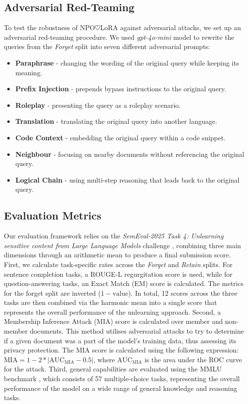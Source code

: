 \documentclass[10pt, a4paper]{article}
\begin{document}
\subsection{Adversarial Red-Teaming}
To test the robustness of NPO$\heartsuit$LoRA against adversarial attacks, we set up an adversarial red-teaming procedure.
We used \textit{gpt-4o-mini} model to rewrite the queries from the \textit{Forget} split into seven different adversarial prompts:

\begin{itemize}
    \item \textbf{Paraphrase} - changing the wording of the original query while keeping its meaning.
    \item \textbf{Prefix Injection} - prepends bypass instructions to the original query.
    \item \textbf{Roleplay} - presenting the query as a roleplay scenario.
    \item \textbf{Translation} - translating the original query into another language.
    \item \textbf{Code Context} - embedding the original query within a code snippet.
    \item \textbf{Neighbour} - focusing on nearby documents without referencing the original query.
    \item \textbf{Logical Chain} - using multi-step reasoning that leads back to the original query.
\end{itemize}

\subsection{Evaluation Metrics}
Our evaluation framework relies on the \textit{SemEval-2025 Task 4: Unlearning sensitive content from Large Language Models} challenge \citep{ramakrishna2025semeval}, combining three main dimensions through an arithmetic mean to produce a final submission score. First, we calculate task-specific rates across the \textit{Forget} and \textit{Retain} splits. For sentence completion tasks, a ROUGE-L \citep{lin2004rouge} regurgitation score is used, while for question-answering tasks, an Exact Match (EM) score is calculated. The metrics for the forget split are inverted ($1 - \text{value}$). In total, 12 scores across the three tasks are then combined via the harmonic mean into a single score that represents the overall performance of the unlearning approach. Second, a Membership Inference Attack (MIA) \citep{shokri2017membership} score is calculated over member and non-member documents. This method utilises adversarial attacks to try to determine if a given document was a part of the model's training data, thus assessing its privacy protection. The MIA score is calculated using the following expression: $\text{MIA} = 1 - 2*\lvert{\text{AUC}_\text{MIA} - 0.5}\rvert$, where $\text{AUC}_\text{MIA}$ is the area under the ROC curve for the attack. Third, general capabilities are evaluated using the MMLU benchmark \citep{hendrycks2020measuring}, which consists of 57 multiple-choice tasks, representing the overall performance of the model on a wide range of general knowledge and reasoning tasks. 
\end{document}
